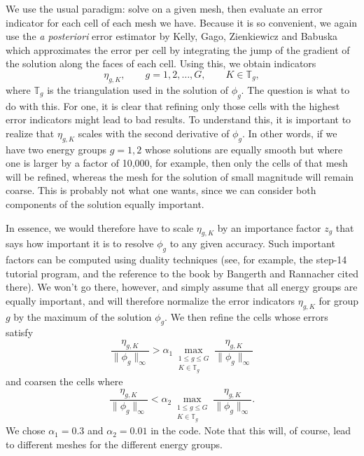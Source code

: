 \documentclass{article}
\begin{document}
We use the usual paradigm: solve on a given mesh, then evaluate an error
indicator for each cell of each mesh we have. Because it is so convenient, we
again use the \emph{a posteriori} error estimator by Kelly, Gago, Zienkiewicz
and Babuska which approximates the error per cell by integrating the jump of
the gradient of the solution along the faces of each cell. Using this, we
obtain indicators
\begin{equation}
\eta_{g,K}, \qquad g=1,2,\ldots,G,\qquad K\in{\mathbb T}_g,
\end{equation}
where ${\mathbb T}_g$ is the triangulation used in the solution of
$\phi_g$. The question is what to do with this. For one, it is clear that
refining only those cells with the highest error indicators might lead to bad
results. To understand this, it is important to realize that $\eta_{g,K}$
scales with the second derivative of $\phi_g$. In other words, if we have two
energy groups $g=1,2$ whose solutions are equally smooth but where one is
larger by a factor of 10,000, for example, then only the cells of that mesh
will be refined, whereas the mesh for the solution of small magnitude will
remain coarse. This is probably not what one wants, since we can consider both
components of the solution equally important.

In essence, we would therefore have to scale $\eta_{g,K}$ by an importance
factor $z_g$ that says how important it is to resolve $\phi_g$ to any given
accuracy. Such important factors can be computed using duality techniques
(see, for example, the step-14 tutorial program, and the
reference to the book by Bangerth and Rannacher cited there). We won't go
there, however, and simply assume that all energy groups are equally
important, and will therefore normalize the error indicators $\eta_{g,K}$ for
group $g$ by the maximum of the solution $\phi_g$. We then refine the cells
whose errors satisfy
\begin{equation}
  \frac{\eta_{g,K}}{\|\phi_g\|_\infty}
  >
  \alpha_1
  \displaystyle{\max_{\substack{1\le g\le G\\K\in {\mathbb T}_g}}
    \frac{\eta_{g,K}}{\|\phi_g\|_\infty}}
\end{equation}
and coarsen the cells where
\begin{equation}
  \frac{\eta_{g,K}}{\|\phi_g\|_\infty}
  <
  \alpha_2
  \displaystyle{\max_{\substack{1\le g\le G\\K\in {\mathbb T}_g}}
    \frac{\eta_{g,K}}{\|\phi_g\|_\infty}}.
\end{equation}
We chose $\alpha_1=0.3$ and $\alpha_2=0.01$ in the code. Note that this will,
of course, lead to different meshes for the different energy groups.
\end{document}
